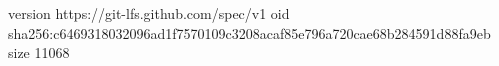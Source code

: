 version https://git-lfs.github.com/spec/v1
oid sha256:c6469318032096ad1f7570109c3208acaf85e796a720cae68b284591d88fa9eb
size 11068
